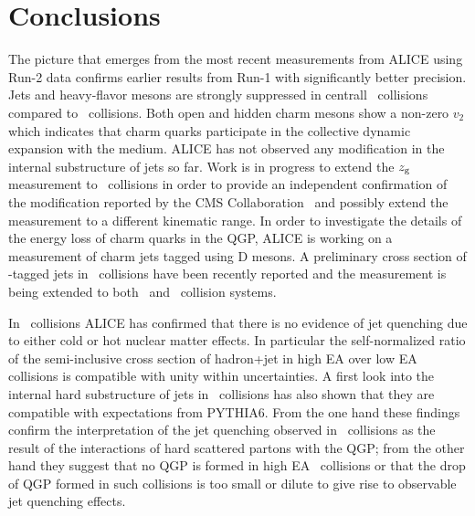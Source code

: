 \documentclass[10pt]{article}
\begin{document}
\section{Conclusions}
The picture that emerges from the most recent measurements from ALICE using Run-2 data confirms earlier results from Run-1 with significantly better precision.
Jets and heavy-flavor mesons are strongly suppressed in centrall \PbPb\ collisions compared to \pp\ collisions. Both open and hidden charm mesons show a non-zero $v_2$ which indicates 
that charm quarks participate in the collective dynamic expansion with the medium.
ALICE has not observed any modification in the internal substructure of jets so far. Work is in progress to extend the $z_{\rm g}$ measurement to \PbPb\ collisions
in order to provide an independent confirmation of the modification reported by the CMS Collaboration~\cite{} and possibly extend the measurement to a different kinematic range.
In order to investigate the details of the energy loss of charm quarks in the QGP, ALICE is working on a measurement of charm jets tagged using D mesons.
A preliminary cross section of \Dzero-tagged jets in \pp\ collisions have been recently reported and the measurement is being extended to both \pPb\ and \PbPb\ collision systems.

In \pPb\ collisions ALICE has confirmed that there is no evidence of jet quenching due to either cold or hot nuclear matter effects.
In particular the self-normalized ratio of the semi-inclusive cross section of hadron+jet in high EA over low EA collisions is compatible with unity within uncertainties.
A first look into the internal hard substructure of jets in \pPb\ collisions has also shown that they are compatible with expectations from PYTHIA6.
From the one hand these findings confirm the interpretation of the jet quenching observed in \PbPb\ collisions as the result of the interactions of hard scattered partons
with the QGP; from the other hand they suggest that no QGP is formed in high EA \pPb\ collisions or that the drop of QGP formed in such collisions is too small or dilute to give rise to observable jet quenching effects.
 
\end{document}
